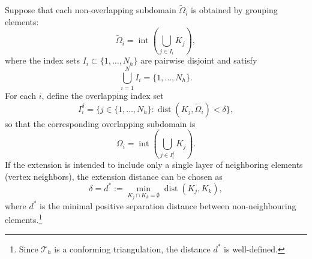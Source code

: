 \documentclass[a4paper, 11pt]{article}
\theoremstyle{remark}
\begin{document}
\begin{enumerate}[label=(\arabic*)]
Suppose that each non-overlapping subdomain $\widetilde{\Omega}_i$ is obtained by grouping elements:  
\begin{equation*}
    \widetilde{\Omega}_i = \operatorname{int}\left(\bigcup_{j \in I_i} K_j \right),
\end{equation*}  
where the index sets $I_i \subset \{1, \ldots, N_h\}$ are pairwise disjoint and satisfy  
\begin{equation*}
    \bigcup_{i=1}^{N} I_i = \{1, \ldots, N_h\}.
\end{equation*}  
For each $i$, define the overlapping index set
\begin{equation*}
    I_i^\delta = \{ j \in \{1, \ldots, N_h\} : \operatorname{dist}(K_j, \widetilde{\Omega}_i) < \delta \},
\end{equation*}  
so that the corresponding overlapping subdomain is  
\begin{equation*}
    \Omega_i = \operatorname{int} \left(\bigcup_{j \in I_i^\delta} K_j \right).
\end{equation*}  
If the extension is intended to include only a single layer of neighboring elements (vertex neighbors), the extension distance can be chosen as  
\begin{equation*}
    \delta = d^{*} := \min_{K_{j}\cap K_{k} = \emptyset}\operatorname{dist}(K_{j}, K_{k}),
\end{equation*} 
where $d^{*}$ is the minimal positive separation distance between non-neighbouring elements.\footnote{Since $\mathcal{T}_h$ is a conforming triangulation, the distance $d^{*}$ is well-defined.}


\end{enumerate}
\end{document}
